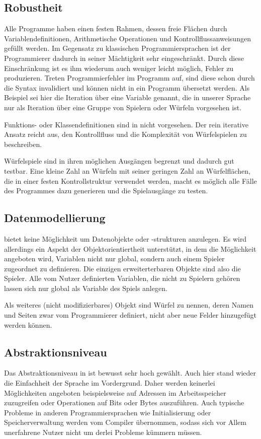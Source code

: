 	\subsection{Robustheit}
	\label{sub:robustheit}
		Alle \dg Programme haben einen festen Rahmen, dessen freie Flächen durch Variablendefinitionen, Arithmetische Operationen und Kontrollflussanweisungen gefüllt werden. Im Gegensatz zu klassischen Programmiersprachen ist der Programmierer dadurch in seiner Mächtigkeit sehr eingeschränkt. Durch diese Einschränkung ist es ihm wiederum auch weniger leicht möglich, Fehler zu produzieren. Treten Programmierfehler im \dg Programm auf, sind diese schon durch die Syntax invalidiert und können nicht in ein Programm übersetzt werden. Als Beispiel sei hier die Iteration über eine Variable genannt, die in unserer Sprache nur als Iteration über eine Gruppe von Spielern oder Würfeln vorgesehen ist. 

		Funktions- oder Klassendefinitionen sind in \dg nicht vorgesehen. Der rein iterative Ansatz reicht aus, den Kontrollfluss und die Komplexität von Würfelspielen zu beschreiben.

		Würfelspiele sind in ihren möglichen Ausgängen begrenzt und dadurch gut testbar. Eine kleine Zahl an Würfeln mit seiner geringen Zahl an Würfelflächen, die in einer festen Kontrollstruktur verwendet werden, macht es möglich alle Fälle des Programmes dazu generieren und die Spielausgänge zu testen.

	\subsection{Datenmodellierung}
	\label{sub:datenmodellierung}
		\dg bietet keine Möglichkeit um Datenobjekte oder -strukturen anzulegen. Es wird allerdings ein Aspekt der Objektorientiertheit unterstützt, in dem die Möglichkeit angeboten wird, Variablen nicht nur global, sondern auch einem Spieler zugeordnet zu definieren. Die einzigen erweiterterbaren Objekte sind also die Spieler. Alle vom Nutzer definierten Variablen, die nicht zu Spielern gehören lassen sich nur global als Variable des Spiels anlegen.

		Als weiteres (nicht modifizierbares) Objekt sind Würfel zu nennen, deren Namen und Seiten zwar vom Programmierer definiert, nicht aber neue Felder hinzugefügt werden können.

	\subsection{Abstraktionsniveau}
	\label{sub:abstraktionsniveau}
		Das Abstraktionsniveau in \dg ist bewusst sehr hoch gewählt. Auch hier stand wieder die Einfachheit der Sprache im Vordergrund. Daher werden keinerlei Möglichkeiten angeboten beispielsweise auf Adressen im Arbeitsspeicher zuzugreifen oder Operationen auf Bits oder Bytes auszuführen. Auch typische Probleme in anderen Programmiersprachen wie Initialisierung oder Speicherverwaltung werden vom Compiler übernommen, sodass sich vor Allem unerfahrene Nutzer nicht um derlei Probleme kümmern müssen.

